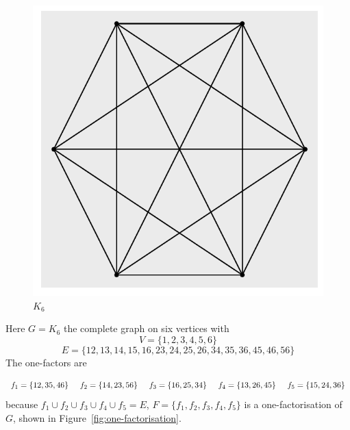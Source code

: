 \documentclass[11pt, a4paper]{book}\usepackage[]{graphicx}\usepackage[]{xcolor}
\makeatletter
\def\maxwidth{ %
  \ifdim\Gin@nat@width>\linewidth
    \linewidth
  \else
    \Gin@nat@width
  \fi
}
\newenvironment{knitrout}{}{} %
\newcounter{example}
\makeatother
\begin{document}
\begin{knitrout}
\color{fgcolor}\begin{figure}

{\centering \includegraphics[width=\maxwidth]{figure/K6-1} 

}

\caption[$K_6$]{$K_6$}\label{fig:K6}
\end{figure}

\end{knitrout}

\begin{example}
Here
$G = K_6$
the complete graph on six vertices with
$$V = \{1, 2, 3, 4, 5, 6\}$$
$$E = \{12, 13, 14, 15, 16, 23, 24, 25, 26, 34, 35, 36, 45, 46, 56\}$$
The one-factors are

$$
f_1 = \{12, 35, 46\} \hspace{0.5cm}
f_2 = \{14, 23, 56\} \hspace{0.5cm}
f_3 = \{16, 25, 34\} \hspace{0.5cm}
f_4 = \{13, 26, 45\} \hspace{0.5cm} 
f_5 = \{15, 24, 36\}
$$
because
$f_1 \cup f_2 \cup f_3 \cup f_4 \cup f_5 = E$,
$F = \{f_1, f_2, f_3, f_4, f_5\}$
is a one-factorisation of
$G$,
shown in Figure~\ref{fig:one-factorisation}.
\end{example}
\end{document}
